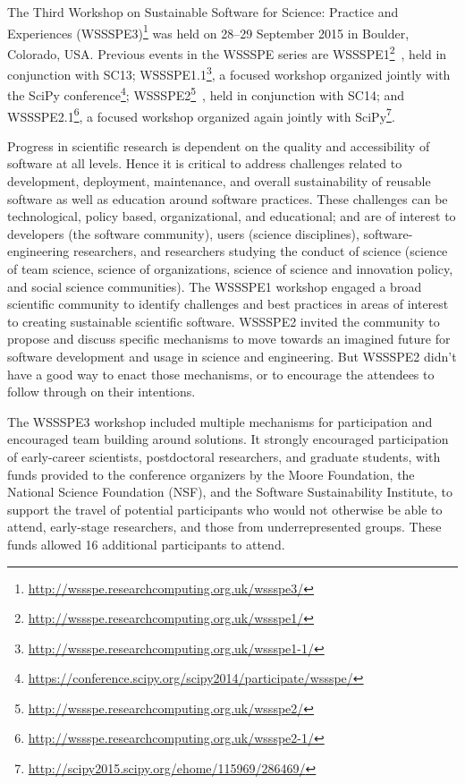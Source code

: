 \documentclass[11pt, oneside]{amsart}
\newcommand{\katznote}[1]{ {\textcolor{magenta}    { ***Dan:      #1 }}}
\newcommand{\gabnote}[1]{ {\textcolor{cyan}    { ***Gabrielle:     #1 }}}
\newcommand{\nchnote}[1]{  {\textcolor{orange}      { ***Neil: #1 }}}
\newcommand{\manishnote}[1]{  {\textcolor{violet}     { ***Manish: #1 }}}
\newcommand{\davidnote}[1]{  {\textcolor{darkgreen}      { ***David: #1 }}}
\begin{document}
%
%
%
%

The Third Workshop on Sustainable Software for Science: Practice and Experiences
(WSSSPE3)\footnote{\url{http://wssspe.researchcomputing.org.uk/wssspe3/}} was
held on 28--29 September 2015 in Boulder, Colorado, USA. Previous events in the
WSSSPE series are
WSSSPE1\footnote{\url{http://wssspe.researchcomputing.org.uk/wssspe1/}}~\cite{WSSSPE1-pre-report,WSSSPE1},
held in conjunction with SC13;
WSSSPE1.1\footnote{\url{http://wssspe.researchcomputing.org.uk/wssspe1-1/}}, a
focused workshop organized jointly with the SciPy
conference\footnote{\url{https://conference.scipy.org/scipy2014/participate/wssspe/}};
WSSSPE2\footnote{\url{http://wssspe.researchcomputing.org.uk/wssspe2/}}~\cite{WSSSPE2-pre-report,WSSSPE2},
held in conjunction with SC14; and
WSSSPE2.1\footnote{\url{http://wssspe.researchcomputing.org.uk/wssspe2-1/}}, a
focused workshop organized again jointly with
SciPy\footnote{\url{http://scipy2015.scipy.org/ehome/115969/286469/}}.

Progress in scientific research is dependent on the quality and accessibility of
software at all levels. Hence it is critical to address challenges related to
development, deployment, maintenance, and overall sustainability of reusable
software as well as education around software practices. These challenges can be
technological, policy based, organizational, and educational; and are of
interest to developers (the software community), users (science disciplines),
software-engineering researchers, and researchers studying the conduct of
science (science of team science, science of organizations, science of science
and innovation policy, and social science communities). The WSSSPE1 workshop
engaged a broad scientific community to identify challenges and best practices
in areas of interest to creating sustainable scientific software. WSSSPE2
invited the community to propose and discuss specific mechanisms to move towards
an imagined future for software development and usage in science and
engineering. But WSSSPE2 didn't have a good way to enact those mechanisms, or to
encourage the attendees to follow through on their intentions.

The WSSSPE3 workshop included multiple mechanisms for participation and
encouraged team building around solutions. It strongly encouraged participation
of early-career scientists, postdoctoral researchers, and graduate students,
with funds provided to the conference organizers by the Moore Foundation, the
National Science Foundation (NSF), and the Software Sustainability Institute, to
support the travel of potential participants who would not otherwise be able to
attend, early-stage researchers, and those from underrepresented groups. These
funds allowed 16 additional participants to attend.
\end{document}

